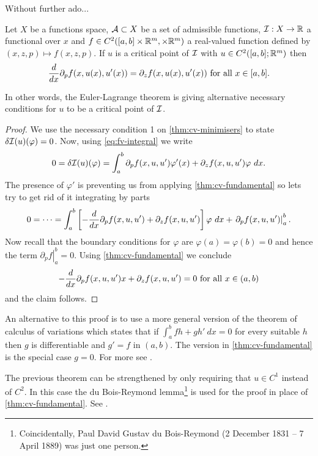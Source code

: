 Without further ado...

\begin{thm}

  Let $X$ be a functions space, $\mathcal{A} \subset X$ be a set of admissible
  functions, $\mathcal{I}: X \to \mathbb{R}$ a functional over $x$ and $f \in C^2([a, b]
  \times \mathbb{R}^m, \times \mathbb{R}^m)$ a real-valued function defined by $(x, z, p)
  \mapsto f(x, z, p)$. If $u$ is a critical point of $\mathcal{I}$ with $u \in
  C^2([a, b]; \mathbb{R}^m)$ then
  \begin{align}
    \label{eq:euler-lagrange}
    \frac{d}{dx} \partial_p f(x, u(x), u'(x)) = \partial_z f(x, u(x), u'(x)) \text{ for all } x \in [a, b].
  \end{align}
\end{thm}

In other words, the Euler-Lagrange theorem is giving alternative necessary
conditions for $u$ to be a critical point of $\mathcal{I}$.

\begin{proof}
  We use the necessary condition 1 on \autoref{thm:cv-minimisers} to state $\delta \mathcal{I}(u)(\varphi) = 0$. Now, using \eqref{eq:fv-integral} we write
  \[
    0 = \delta \mathcal{I}(u) (\varphi)
    = \int_a^b \partial_p f(x, u, u') \varphi'(x) + \partial_z f(x, u, u') \varphi\ dx.
  \]
  The presence of $\varphi'$ is preventing us from applying
  \autoref{thm:cv-fundamental} so lets try to get rid of it integrating by
  parts
  \[
    0 = \dots
      = \int_a^b \left[ - \frac{d}{dx} \partial_p f(x, u, u') + \partial_z f(x, u, u') \right] \varphi \ dx
        + \left. \partial_p f(x, u, u') \right|_a^b.
  \]
  Now recall that the boundary conditions for $\varphi$ are $\varphi(a) =
  \varphi(b) = 0$ and hence the term $\left. \partial_p f\right|_a^b = 0$.
    Using \autoref{thm:cv-fundamental} we conclude
    \[
      -\frac{d}{dx} \partial_p f(x, u, u')x + \partial_z f(x, u, u') = 0
      \text{ for all } x \in (a, b)
    \]
    and the claim follows.
\end{proof}

An alternative to this proof is to use a more general version of the theorem of
calculus of variations which states that if $\int_a^b fh + gh'\ dx = 0$ for
every suitable $h$ then $g$ is differentiable and $g' = f$ in $(a, b)$. The
version in \autoref{thm:cv-fundamental} is the special case $g = 0$. For more
see \cite{wikicvfundamental}. 

\begin{remark}
  The previous theorem can be strengthened by only requiring that $u \in C^1$
  instead of $C^2$. In this case the du Bois-Reymond
  lemma\footnote{Coincidentally, Paul David Gustav du Bois-Reymond (2 December
  1831 – 7 April 1889) was just one person.} is used for the proof in place of
  \autoref{thm:cv-fundamental}. See \cite{dubois}.
\end{remark}


